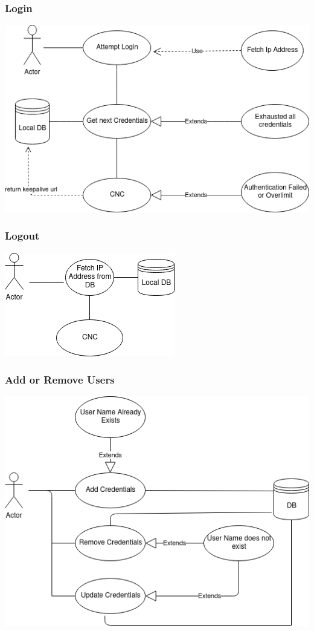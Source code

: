 \subsubsection{Login}
\includegraphics[scale=0.7]{images/login.png}

\subsubsection{Logout}
\includegraphics[scale=0.7]{images/Logout.png}

\subsubsection{Add or Remove Users}
\includegraphics[scale=0.7]{images/add.png}

